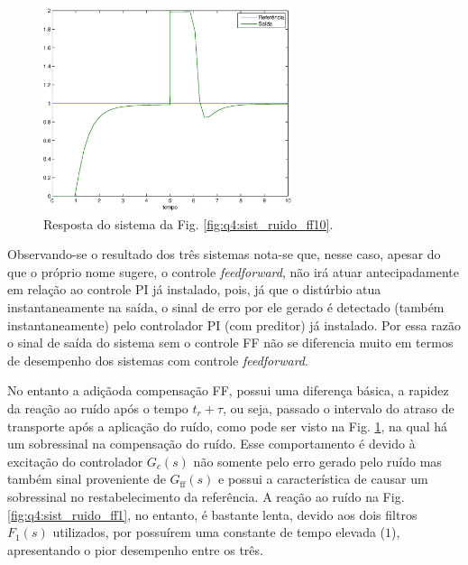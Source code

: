 \begin{figure}[H]
\centering
\includegraphics[width=0.65\textwidth]{imgs/questao4/saida_ruido_ff2}
\caption{Resposta do sistema da Fig. \ref{fig:q4:sist_ruido_ff10}.}
\label{fig:q4:saida_ruido_ff10}
\end{figure}

Observando-se o resultado dos três sistemas nota-se que, nesse caso, apesar do
que o próprio nome sugere, o controle {\it feedforward}, não irá atuar
antecipadamente em relação ao controle PI já instalado, pois, já que o distúrbio
atua instantaneamente na saída, o sinal de erro por ele gerado é detectado
(também instantaneamente) pelo controlador PI (com preditor) já instalado. Por
essa razão o sinal de saída do sistema sem o controle FF não se diferencia muito
em termos de desempenho dos sistemas com controle {\it feedforward}.

No entanto a adiçãoda compensação FF, possui uma diferença básica, a rapidez da
reação ao ruído após o tempo $t_r + \tau$, ou seja, passado o intervalo do
atraso de transporte após a aplicação do ruído, como pode ser visto na Fig.
\ref{fig:q4:saida_ruido_ff10}, na qual há um sobressinal na compensação do
ruído. Esse comportamento é devido à excitação do controlador $G_c(s)$ não
somente pelo erro gerado pelo ruído mas também sinal proveniente de
$G_\text{ff}(s)$ e possui a característica de causar um sobressinal no
restabelecimento da referência. A reação ao ruído na Fig.
\ref{fig:q4:sist_ruido_ff1}, no entanto, é bastante lenta, devido aos dois
filtros $F_1(s)$ utilizados, por possuírem uma constante de tempo elevada
($1$), apresentando o pior desempenho entre os três.
